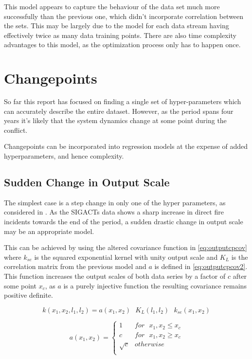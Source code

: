 \documentclass[a4paper,11pt]{report}
\begin{document}
This model appears to capture the behaviour of the data set much more successfully than the previous one, which didn't incorporate correlation between the sets. This may be largely due to the model for each data stream having effectively twice as many data training points. There are also time complexity advantages to this model, as the optimization process only has to happen once.


\chapter{Changepoints}

So far this report has focused on finding a single set of hyper-parameters which can accurately describe the entire dataset. However, as the period spans four years it's likely that the system dynamics change at some point during the conflict.

Changepoints can be incorporated into regression models at the expense of added hyperparameters, and hence complexity.

\section{Sudden Change in Output Scale}

The simplest case is a step change in only one of the hyper parameters, as considered in \cite{changepoint-prediction}. As the SIGACTs data shows a sharp increase in direct fire incidents towards the end of the period, a sudden drastic change in output scale may be an appropriate model.

This can be achieved by using the altered covariance function in \ref{eq:outputcpcov} where \(k_{se}\) is the squared exponential kernel with unity output scale and \(K_L\) is the correlation matrix from the previous model and \(a\) is defined in \ref{eq:outputcpcov2}. This function increases the output scales of both data series by a factor of \(c\) after some point \(x_c\), as \(a\) is a purely injective function the resulting covariance remains positive definite. 

\singlespacing
\begin{equation} \label{eq:outputcpcov}
k(x_1,x_2,l_1,l_2) = a(x_1,x_2)\text{ } K_L(l_1,l_2) \text{ }k_{se}(x_1,x_2)
\end{equation}

\begin{equation} \label{eq:outputcpcov2}
a(x_1,x_2) = \begin{cases}
1 & for \text{ } x_1, x_2 \leq x_c \\
c & for \text{ } x_1, x_2 \geq x_c \\ 
\sqrt{c} & otherwise \\ 
\end{cases}
\end{equation}
\doublespacing
\end{document}

